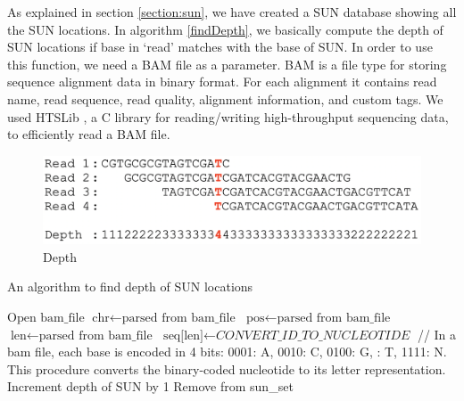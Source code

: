 As explained in section \ref{section:sun}, we have created a SUN database showing all the SUN locations. In algorithm \ref{findDepth}, we basically compute the depth of SUN locations if base in `read' matches with the base of SUN. In order to use this function, we need a BAM file as a parameter. BAM \cite{li2009sequence} is a file type for storing sequence alignment data in binary format. For each alignment it contains read name, read sequence, read quality, alignment information, and custom tags. We used HTSLib \cite{htslib}, a C library for reading/writing high-throughput sequencing data, to efficiently read a BAM file.
\begin{figure}[ht]
    \centering
    \includegraphics[scale=0.4]{images/depthofcoverage.png}
    \caption{Depth}
    \label{depthOfCoverage}
\end{figure}
\begin{algorithm}
\caption{An algorithm to find depth of SUN locations}
\label{findDepth}
\begin{algorithmic}[1]
\State $\text{Open bam\_file}$
\State $\text{chr} \gets \text{parsed from bam\_file}$
\State $\text{pos} \gets \text{parsed from bam\_file}$
\State $\text{len} \gets \text{parsed from bam\_file}$
\State $\text{seq[len]} \gets \textit{CONVERT\_ID\_TO\_NUCLEOTIDE}$ // In a bam file, 
\State each base is encoded in 4 bits: 0001: A, 0010: C, 0100: G, 
: T, 1111: N. This procedure converts the binary-coded 
\State nucleotide to its letter representation.
\State Increment depth of SUN by 1
\Else
\State Remove from sun\_set
\EndIf
\EndFor
\EndFor
\EndIf
\EndProcedure
\end{algorithmic}
\end{algorithm}

